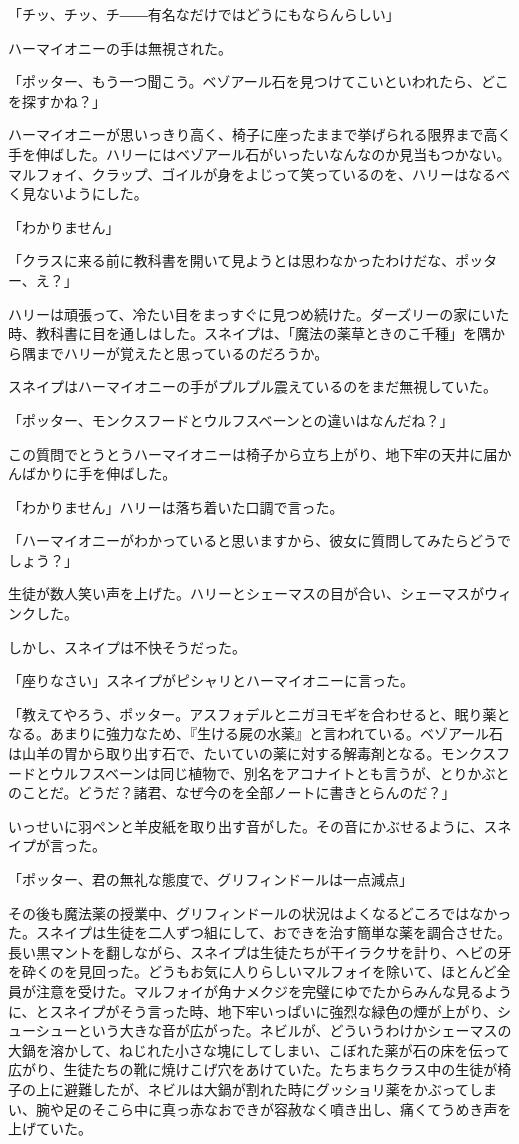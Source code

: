 \documentclass[10pt,a4paper]{article}
\begin{document}
\begin{CJK}{UTF8}{min}
「チッ、チッ、チ――有名なだけではどうにもならんらしい」

ハーマイオニーの手は無視された。

「ポッター、もう一つ聞こう。ベゾアール石を見つけてこいといわれたら、どこを探すかね？」

ハーマイオニーが思いっきり高く、椅子に座ったままで挙げられる限界まで高く手を伸ばした。ハリーにはベゾアール石がいったいなんなのか見当もつかない。マルフォイ、クラップ、ゴイルが身をよじって笑っているのを、ハリーはなるべく見ないようにした。

「わかりません」

「クラスに来る前に教科書を開いて見ようとは思わなかったわけだな、ポッター、え？」

ハリーは頑張って、冷たい目をまっすぐに見つめ続けた。ダーズリーの家にいた時、教科書に目を通しはした。スネイプは、「魔法の薬草ときのこ千種」を隅から隅までハリーが覚えたと思っているのだろうか。

スネイプはハーマイオニーの手がプルプル震えているのをまだ無視していた。

「ポッター、モンクスフードとウルフスベーンとの違いはなんだね？」

この質問でとうとうハーマイオニーは椅子から立ち上がり、地下牢の天井に届かんばかりに手を伸ばした。

「わかりません」ハリーは落ち着いた口調で言った。

「ハーマイオニーがわかっていると思いますから、彼女に質問してみたらどうでしょう？」

生徒が数人笑い声を上げた。ハリーとシェーマスの目が合い、シェーマスがウィンクした。

しかし、スネイプは不快そうだった。

「座りなさい」スネイプがピシャリとハーマイオニーに言った。

「教えてやろう、ポッター。アスフォデルとニガヨモギを合わせると、眠り薬となる。あまりに強力なため、『生ける屍の水薬』と言われている。ベゾアール石は山羊の胃から取り出す石で、たいていの薬に対する解毒剤となる。モンクスフードとウルフスベーンは同じ植物で、別名をアコナイトとも言うが、とりかぶとのことだ。どうだ？諸君、なぜ今のを全部ノートに書きとらんのだ？」

いっせいに羽ペンと羊皮紙を取り出す音がした。その音にかぶせるように、スネイプが言った。

「ポッター、君の無礼な態度で、グリフィンドールは一点減点」

その後も魔法薬の授業中、グリフィンドールの状況はよくなるどころではなかった。スネイプは生徒を二人ずつ組にして、おできを治す簡単な薬を調合させた。長い黒マントを翻しながら、スネイプは生徒たちが干イラクサを計り、ヘビの牙を砕くのを見回った。どうもお気に人りらしいマルフォイを除いて、ほとんど全員が注意を受けた。マルフォイが角ナメクジを完璧にゆでたからみんな見るように、とスネイプがそう言った時、地下牢いっぱいに強烈な緑色の煙が上がり、シューシューという大きな音が広がった。ネビルが、どういうわけかシェーマスの大鍋を溶かして、ねじれた小さな塊にしてしまい、こぼれた薬が石の床を伝って広がり、生徒たちの靴に焼けこげ穴をあけていた。たちまちクラス中の生徒が椅子の上に避難したが、ネビルは大鍋が割れた時にグッショリ薬をかぶってしまい、腕や足のそこら中に真っ赤なおできが容赦なく噴き出し、痛くてうめき声を上げていた。


\end{CJK}
\end{document}
